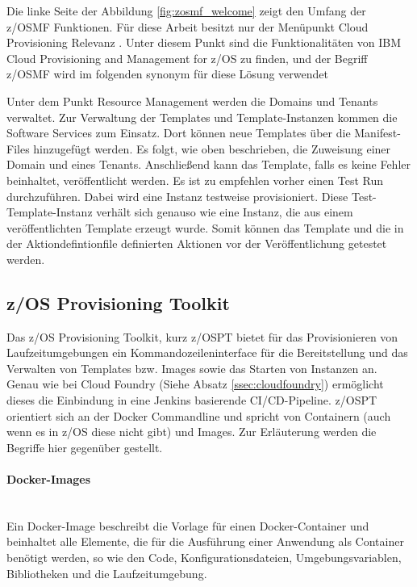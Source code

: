 Die linke Seite der Abbildung \ref{fig:zosmf_welcome} zeigt den Umfang der z/OSMF  Funktionen.
Für diese Arbeit besitzt nur der Menüpunkt \glqq Cloud Provisioning\grqq{} Relevanz .
Unter diesem Punkt sind die Funktionalitäten von \glqq IBM Cloud Provisioning and Management for z/OS\grqq{} zu finden, und der Begriff  \glqq z/OSMF\grqq{} wird im folgenden synonym für diese Lösung verwendet
\cite{Rotthove.2018}

Unter dem Punkt \glqq Resource Management\grqq{} werden die \glqq Domains\grqq{} und \glqq Tenants\grqq{} verwaltet.
Zur Verwaltung der Templates und Template-Instanzen kommen die \glqq Software Services\grqq{} zum Einsatz.
Dort können neue Templates über die Manifest-Files hinzugefügt werden.
Es folgt, wie oben beschrieben, die Zuweisung einer \glqq Domain\grqq{} und eines \glqq Tenants\grqq{}.
Anschließend kann das Template, falls es keine Fehler beinhaltet, veröffentlicht werden.
Es ist zu empfehlen vorher einen \glqq Test Run\grqq{} durchzuführen.
Dabei wird eine Instanz testweise provisioniert.
Diese Test-Template-Instanz verhält sich genauso wie eine Instanz, die aus einem veröffentlichten Template erzeugt wurde. 
Somit können das Template und die in der Aktiondefintionfile definierten Aktionen vor der Veröffentlichung getestet werden.
\cite[S. 8]{Rotthove.2018}


\subsection{z/OS Provisioning Toolkit}\label{sssec:zospt}
Das z/OS Provisioning Toolkit, kurz z/OSPT bietet für das Provisionieren von Laufzeitumgebungen ein Kommandozeileninterface für die Bereitstellung und das Verwalten von Templates bzw. \glqq Images\grqq{} sowie das Starten von Instanzen an.
Genau wie bei Cloud Foundry (Siehe Absatz \ref{ssec:cloudfoundry}) ermöglicht dieses die Einbindung in eine Jenkins basierende CI/CD-Pipeline.
z/OSPT orientiert sich an der Docker Commandline und spricht von Containern (auch wenn es in z/OS diese nicht gibt) und Images.
Zur Erläuterung werden die Begriffe hier  gegenüber gestellt.

\paragraph{\glqq Docker-Images\grqq}~\\
Ein Docker-Image beschreibt die Vorlage für einen Docker-Container und beinhaltet alle Elemente, die für die Ausführung einer Anwendung als Container benötigt werden, so wie den Code, Konfigurationsdateien, Umgebungsvariablen, Bibliotheken und die Laufzeitumgebung.

